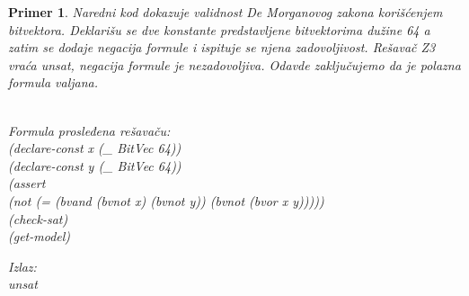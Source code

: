 \documentclass[12pt,oneside]{memoir}
\newtheorem{primer}{Primer}
\begin{document}
\begin{primer} Naredni kod dokazuje validnost De Morganovog zakona korišćenjem bitvektora. Deklarišu se dve konstante predstavljene bitvektorima dužine 64 a zatim se dodaje negacija formule i ispituje se njena zadovoljivost. Rešavač Z3 vraća unsat, negacija formule je nezadovoljiva.
Odavde zaključujemo da je polazna formula valjana.
\\ \\
\hspace{9.5cm}
\begin{minipage}[t]{0.5\textwidth}
Formula prosleđena rešavaču:
\\(declare-const x (\_ BitVec 64))
\\(declare-const y (\_ BitVec 64))
\\(assert 
\\(not (= (bvand (bvnot x) (bvnot y)) (bvnot (bvor x y)))))
\\(check-sat)
\\(get-model)
\end{minipage}
\hspace{2.5cm}
\begin{minipage}[t]{0.5\textwidth}
Izlaz:
\\unsat
\end{minipage}
\end{primer}
\end{document}
